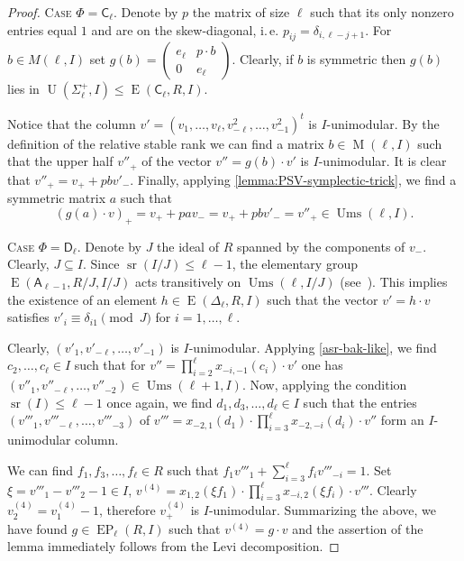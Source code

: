 \documentclass[11pt]{amsart}
\theoremstyle{plain}
\numberwithin{equation}{section}
\numberwithin{lemma}{section}
\theoremstyle{definition}
\theoremstyle{remark}
\DeclareMathOperator{\E}{E}
\DeclareMathOperator{\EP}{EP}
\DeclareMathOperator{\U}{U}
\DeclareMathOperator{\M}{M}
\DeclareMathOperator{\sr}{sr}
\DeclareMathOperator{\Ums}{Ums}
\newcommand{\rA}{\mathsf{A}}
\newcommand{\rC}{\mathsf{C}}
\newcommand{\rD}{\mathsf{D}}
\begin{document}
\begin{proof} 
\textsc{Case $\Phi=\rC_\ell$.}
Denote by $p$ the matrix of size $\ell$ such that its only nonzero entries equal $1$ and are on the skew-diagonal, i.\,e. $p_{ij}=\delta_{i, \ell-j+1}$. 
For $b \in M(\ell, I)$ set $g(b)=\left(\begin{smallmatrix} e_\ell & p \cdot b \\ 0 & e_{\ell} \end{smallmatrix}\right)$.
Clearly, if $b$ is symmetric then $g(b)$ lies in $\U(\Sigma_\ell^+, I)\leq \E(\rC_\ell, R, I)$.

Notice that the column $v'=(v_1,\ldots,v_\ell, v_{-\ell}^2,\ldots,v_{-1}^2)^t$ is $I$-unimodular.
By the definition of the relative stable rank we can find a matrix $b\in \M(\ell,I)$ such that the upper half $v''_+$ of the vector $v''= g(b) \cdot v'$ is $I$-unimodular.
It is clear that $v''_+ = v_+ + pb v'_-$. 
Finally, applying \cref{lemma:PSV-symplectic-trick}, we find a symmetric matrix $a$ such that
\[ (g(a)\cdot v)_+=v_+ + pav_- = v_+ + pbv'_- = v''_+ \in \Ums(\ell, I). \]

\textsc{Case $\Phi=\rD_\ell$.} Denote by $J$ the ideal of $R$ spanned by the components of $v_{-}$. Clearly, $J \subseteq I$.
Since $\sr(I/J) \leqslant \ell-1$, the elementary group $\E(\rA_{\ell-1}, R/J, I/J)$ acts transitively on $\Ums(\ell, I/J)$ (see~\cite[Theorem~2.3c]{Va69}). 
This implies the existence of an element $h\in \E(\Delta_\ell, R, I)$ such that the vector $v' = h \cdot v$ satisfies $v'_i \equiv \delta_{i1} \pmod J$ for $i=1, \ldots, \ell$.

Clearly, $(v'_1, v'_{-\ell}, \ldots, v'_{-1})$ is $I$-unimodular.
Applying \cref{asr-bak-like}, we find $c_2, \ldots, c_\ell\in I$ such that for $v''= \prod_{i=2}^{\ell}x_{-i, -1}(c_i)\cdot v'$ one has
$(v''_1, v''_{-\ell},\ldots, v''_{-2})\in\Ums(\ell+1, I)$.
Now, applying the condition $\sr(I) \leqslant \ell-1$ once again, we find
$d_1, d_3, \ldots, d_{\ell}\in I$ such that the entries $(v'''_1, v'''_{-\ell}, \ldots, v'''_{-3})$
of $v'''=x_{-2, 1}(d_1) \cdot \prod_{i=3}^{\ell} x_{-2, -i}(d_i) \cdot v''$ form an $I$-unimodular column.

We can find $f_1, f_3,\ldots, f_\ell \in R$ such that $f_1v'''_1+\sum_{i=3}^\ell f_i v'''_{-i} = 1$.
Set $\xi = v'''_1-v'''_2-1 \in I$, $v^{(4)}=x_{1,2}(\xi f_1) \cdot \prod_{i=3}^\ell x_{-i,2}(\xi f_i) \cdot v'''$.
Clearly $v^{(4)}_2 = v^{(4)}_1-1$, therefore $v^{(4)}_+$ is $I$-unimodular.
Summarizing the above, we have found $g\in \EP_\ell(R, I)$ such that $v^{(4)}=g \cdot v$
and the assertion of the lemma immediately follows from the Levi decomposition. \end{proof}
\end{document}
